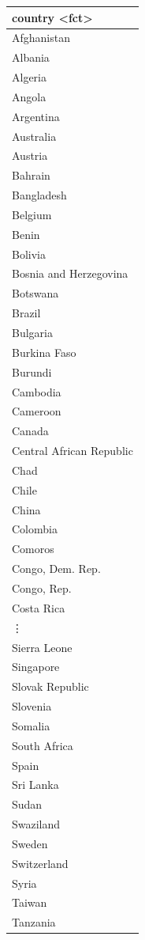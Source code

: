 \documentclass[
  letterpaper,
  DIV=11,
  numbers=noendperiod]{scrreprt}
\begin{document}
\begin{longtable}[]{@{}l@{}}
\toprule\noalign{}
country \textless fct\textgreater{} \\
\midrule\noalign{}
\endhead
\bottomrule\noalign{}
\endlastfoot
Afghanistan \\
Albania \\
Algeria \\
Angola \\
Argentina \\
Australia \\
Austria \\
Bahrain \\
Bangladesh \\
Belgium \\
Benin \\
Bolivia \\
Bosnia and Herzegovina \\
Botswana \\
Brazil \\
Bulgaria \\
Burkina Faso \\
Burundi \\
Cambodia \\
Cameroon \\
Canada \\
Central African Republic \\
Chad \\
Chile \\
China \\
Colombia \\
Comoros \\
Congo, Dem. Rep. \\
Congo, Rep. \\
Costa Rica \\
⋮ \\
Sierra Leone \\
Singapore \\
Slovak Republic \\
Slovenia \\
Somalia \\
South Africa \\
Spain \\
Sri Lanka \\
Sudan \\
Swaziland \\
Sweden \\
Switzerland \\
Syria \\
Taiwan \\
Tanzania \\

\end{longtable}
\end{document}
